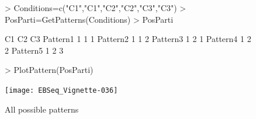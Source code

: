 \documentclass{article}
\begin{document}
\begin{figure}[h!]
\centering
\begin{Schunk}
\begin{Sinput}
> Conditions=c("C1","C1","C2","C2","C3","C3")
> PosParti=GetPatterns(Conditions)
> PosParti
\end{Sinput}
\begin{Soutput}
         C1 C2 C3
Pattern1  1  1  1
Pattern2  1  1  2
Pattern3  1  2  1
Pattern4  1  2  2
Pattern5  1  2  3
\end{Soutput}
\begin{Sinput}
> PlotPattern(PosParti)
\end{Sinput}
\end{Schunk}
\texttt{[image: EBSeq\_Vignette-036]}
\caption{ All possible patterns}
\label{fig:Patterns}
\end{figure}
\newpage
\end{document}
